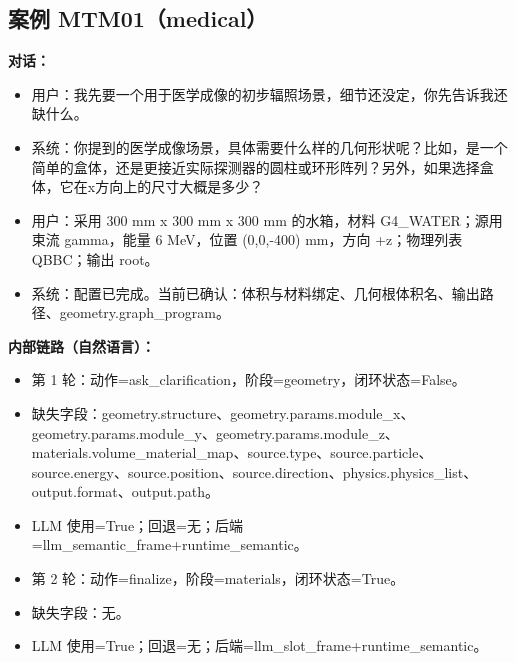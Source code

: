 \documentclass[11pt]{ctexart}
\begin{document}
\subsection{案例 MTM01（medical）}
\textbf{对话：}
\begin{itemize}
\item 用户：我先要一个用于医学成像的初步辐照场景，细节还没定，你先告诉我还缺什么。
\item 系统：你提到的医学成像场景，具体需要什么样的几何形状呢？比如，是一个简单的盒体，还是更接近实际探测器的圆柱或环形阵列？另外，如果选择盒体，它在x方向上的尺寸大概是多少？
\item 用户：采用 300 mm x 300 mm x 300 mm 的水箱，材料 G4\_WATER；源用束流 gamma，能量 6 MeV，位置 (0,0,-400) mm，方向 +z；物理列表 QBBC；输出 root。
\item 系统：配置已完成。当前已确认：体积与材料绑定、几何根体积名、输出路径、geometry.graph\_program。
\end{itemize}
\textbf{内部链路（自然语言）：}
\begin{itemize}
\item 第 1 轮：动作=ask\_clarification，阶段=geometry，闭环状态=False。
\item 缺失字段：geometry.structure、geometry.params.module\_x、geometry.params.module\_y、geometry.params.module\_z、materials.volume\_material\_map、source.type、source.particle、source.energy、source.position、source.direction、physics.physics\_list、output.format、output.path。
\item LLM 使用=True；回退=无；后端=llm\_semantic\_frame+runtime\_semantic。
\item 第 2 轮：动作=finalize，阶段=materials，闭环状态=True。
\item 缺失字段：无。
\item LLM 使用=True；回退=无；后端=llm\_slot\_frame+runtime\_semantic。
\end{itemize}
\end{document}
